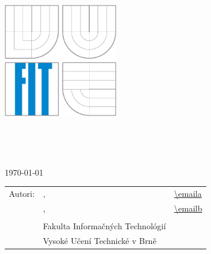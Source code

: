 \begin{titlepage}
	\begin{center}
		\includegraphics[height=5cm]{img/logo.eps}
	\end{center}
	\vfill
	\begin{center}
		\begin{Large}
			\docname\\
		\end{Large}
		\bigskip
		\begin{Huge}
			\projname\\
		\end{Huge}
	\end{center}
	\vfill
	\begin{center}
		\begin{large}
			\today
		\end{large}
	\end{center}
	\vfill
	\begin{flushleft}
		\begin{large}
			\begin{tabular}{lll}
				Autori: & \authora, & \url{\emaila} \\
				        & \authorb, & \url{\emailb} \\
				& & \\
				& Fakulta Informačných Technológií \\
				& Vysoké Učení Technické v Brně \\
			\end{tabular}
		\end{large}
	\end{flushleft}
\end{titlepage}
